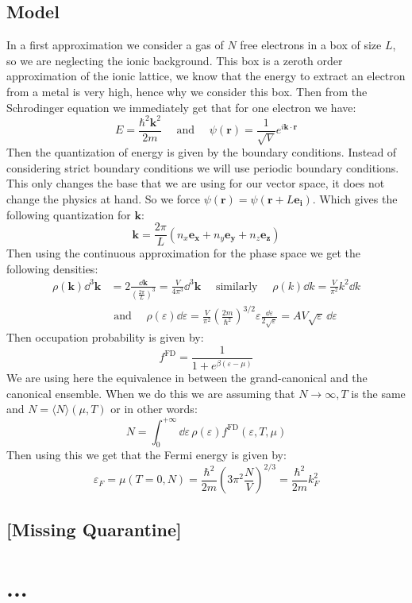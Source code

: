 \documentclass[10pt,a4paper]{book}
\begin{document}
\section{Model}
In a first approximation we consider a gas of $N$ free electrons in a box of size $L$, so we are neglecting the ionic background. This box is a zeroth order approximation of the ionic lattice, we know that the energy to extract an electron from a metal is very high, hence why we consider this box. Then from the Schrodinger equation we immediately get that for one electron we have:
\[
E = \frac{\hbar^2 \mathbf{k}^2}{2m} \quad \text{ and } \quad \psi(\mathbf{r}) = \frac{1}{\sqrt{V}} e^{i \mathbf{k} \cdot \mathbf{r}}
\]
Then the quantization of energy is given by the boundary conditions. Instead of considering strict boundary conditions we will use periodic boundary conditions. This only changes the base that we are using for our vector space, it does not change the physics at hand. So we force $\psi(\mathbf{r}) = \psi(\mathbf{r} + L \mathbf{e_i})$. Which gives the following quantization for $\mathbf{k}$:
\[
\mathbf{k} = \frac{2\pi}{L}(n_x \mathbf{e_x} + n_y \mathbf{e_y} + n_z \mathbf{e_z})
\]
Then using the continuous approximation for the phase space we get the following densities:
\begin{align*}
\rho(\mathbf{k}) \dd^3 \mathbf{k} &= 2 \frac{\dd \mathbf{k}}{\left(\frac{2 \pi}{L}\right)^3} = \frac{V}{4 \pi^3} \dd^3 \mathbf{k} \quad \text{ similarly } \quad \rho(k) \dd k = \frac{V}{\pi^2} k^2 \dd k \\
&\text{ and } \quad \rho(\varepsilon) \dd \varepsilon = \frac{V}{\pi^2} \left(\frac{2m}{\hbar^2}\right)^{3/2} \varepsilon \frac{\dd \varepsilon}{2 \sqrt{\varepsilon}} = A V \sqrt{\varepsilon} \,\dd \varepsilon
\end{align*}
Then occupation probability is given by:
\[
f^\text{FD} = \frac{1}{1 + e^{\beta(\varepsilon - \mu)}}
\]
We are using here the equivalence in between the grand-canonical and the canonical ensemble. When we do this we are assuming that $N \to \infty, T$ is the same and $N = \langle N \rangle (\mu, T)$ or in other words:
\[
N = \int_0^{+\infty} \dd\varepsilon \, \rho(\varepsilon) f^\text{FD}(\varepsilon, T, \mu) 
\]
Then using this we get that the Fermi energy is given by:
\[
\varepsilon_F = \mu(T = 0, N) = \frac{\hbar^2}{2m} \left( 3 \pi^2 \frac{N}{V}\right)^{2/3} = \frac{\hbar^2}{2m} k_F^2
\]

\section{[Missing Quarantine]}

\chapter{...}
\section{}
\end{document}
